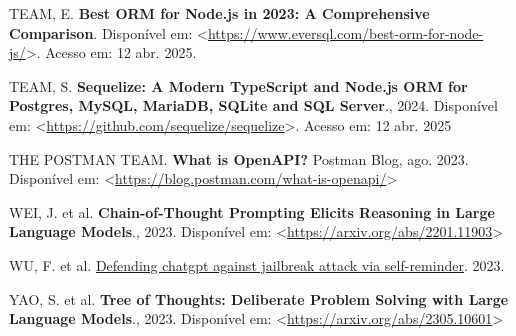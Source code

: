 \documentclass[
]{article}
\newlength{\cslhangindent}
\newenvironment{CSLReferences}[2] %
 {\begin{list}{}{%
  \setlength{\itemindent}{0pt}
  \setlength{\leftmargin}{0pt}
  \setlength{\parsep}{0pt}
  \ifodd #1
   \setlength{\leftmargin}{\cslhangindent}
   \setlength{\itemindent}{-1\cslhangindent}
  \fi
  \setlength{\itemsep}{#2\baselineskip}}}
 {\end{list}}
\begin{document}
\begin{CSLReferences}{0}{1}
TEAM, E. \textbf{Best ORM for Node.js in 2023: A Comprehensive
Comparison}. Disponível em:
\textless{}\url{https://www.eversql.com/best-orm-for-node-js/}\textgreater.
Acesso em: 12 abr. 2025.

TEAM, S. \textbf{Sequelize: A Modern TypeScript and Node.js ORM for
Postgres, MySQL, MariaDB, SQLite and SQL Server}., 2024. Disponível em:
\textless{}\url{https://github.com/sequelize/sequelize}\textgreater.
Acesso em: 12 abr. 2025

THE POSTMAN TEAM. \textbf{{What is OpenAPI?}} Postman Blog, ago. 2023.
Disponível em:
\textless{}\url{https://blog.postman.com/what-is-openapi/}\textgreater{}

WEI, J. et al. \textbf{Chain-of-Thought Prompting Elicits Reasoning in
Large Language Models}., 2023. Disponível em:
\textless{}\url{https://arxiv.org/abs/2201.11903}\textgreater{}

WU, F. et al.
\href{https://www.researchsquare.com/article/rs-2873090/v1}{Defending
chatgpt against jailbreak attack via self-reminder}. 2023.

YAO, S. et al. \textbf{Tree of Thoughts: Deliberate Problem Solving with
Large Language Models}., 2023. Disponível em:
\textless{}\url{https://arxiv.org/abs/2305.10601}\textgreater{}

\end{CSLReferences}
\end{document}
